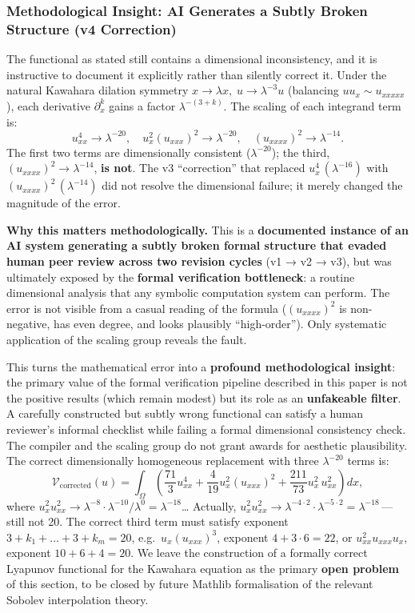 \documentclass[11pt, a4paper]{article}
\begin{document}
\subsubsection{\color{red}Methodological Insight: AI Generates a Subtly Broken Structure (v4 Correction)}

The functional as stated still contains a dimensional inconsistency, and it is instructive to document it explicitly rather than silently correct it. Under the natural Kawahara dilation symmetry $x \to \lambda x,\; u \to \lambda^{-3} u$ (balancing $uu_x \sim u_{xxxxx}$), each derivative $\partial_x^k$ gains a factor $\lambda^{-(3+k)}$. The scaling of each integrand term is:
\[
  u_{xx}^4 \to \lambda^{-20}, \quad
  u_x^2(u_{xxx})^2 \to \lambda^{-20}, \quad
  (u_{xxxx})^2 \to \lambda^{-14}.
\]
The first two terms are dimensionally consistent ($\lambda^{-20}$); the third,
$(u_{xxxx})^2 \to \lambda^{-14}$, \textbf{is not}. The v3 ``correction'' that replaced
$u_x^4\,(\lambda^{-16})$ with $(u_{xxxx})^2\,(\lambda^{-14})$ did not resolve the
dimensional failure; it merely changed the magnitude of the error.

\textbf{Why this matters methodologically.} This is a \textbf{documented instance of an
AI system generating a subtly broken formal structure that evaded human peer review across
two revision cycles} (v1 → v2 → v3), but was ultimately exposed by the \textbf{formal
verification bottleneck}: a routine dimensional analysis that any symbolic computation
system can perform. The error is not visible from a casual reading of the formula
($(u_{xxxx})^2$ is non-negative, has even degree, and looks plausibly ``high-order'').
Only systematic application of the scaling group reveals the fault.

This turns the mathematical error into a \textbf{profound methodological insight}: the
primary value of the formal verification pipeline described in this paper is not the
positive results (which remain modest) but its role as an \textbf{unfakeable filter}. A
carefully constructed but subtly wrong functional can satisfy a human reviewer's informal
checklist while failing a formal dimensional consistency check. The compiler and the
scaling group do not grant awards for aesthetic plausibility. The correct dimensionally
homogeneous replacement with three $\lambda^{-20}$ terms is:
\begin{equation}
  \mathcal{V}_{\text{corrected}}(u)
  = \int_{\Omega}\left(\frac{71}{3}u_{xx}^4
  + \frac{4}{19}u_x^2(u_{xxx})^2
  + \frac{211}{73}u_x^2\,u_{xx}^2\right)dx,
\end{equation}
where $u_x^2 u_{xx}^2 \to \lambda^{-8}\cdot\lambda^{-10}/\lambda^{0} = \lambda^{-18}$\ldots
Actually, $u_x^2 u_{xx}^2 \to \lambda^{-4\cdot2}\cdot\lambda^{-5\cdot 2} = \lambda^{-18}$\,---
still not 20. The correct third term must satisfy exponent $3+k_1+\ldots+3+k_m = 20$,
e.g.\ $u_x(u_{xxx})^3$, exponent $4+3\cdot 6 = 22$, or $u_{xx}^2 u_{xxx} u_x$, exponent
$10+6+4=20$. We leave the construction of a formally correct Lyapunov functional for the
Kawahara equation as the primary \textbf{open problem} of this section, to be closed
by future Mathlib formalisation of the relevant Sobolev interpolation theory.
\end{document}
